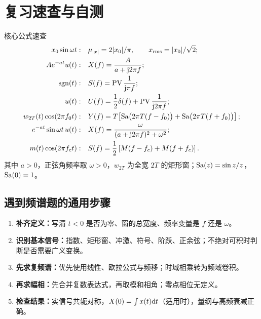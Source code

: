\clearpage
\section{复习速查与自测}
\label{sec:review}

\begin{focusbox}{核心公式速查}
\begin{align*}
x_0\sin\omega t:\quad &\mu_{|x|}=2|x_0|/\pi,\qquad x_{\mathrm{rms}}=|x_0|/\sqrt{2};\\
Ae^{-at}u(t):\quad &X(f)=\frac{A}{a+\mathrm{j}2\pi f};\\
\operatorname{sgn}(t):\quad &S(f)=\operatorname{PV}\frac{1}{\mathrm{j}\pi f};\\
u(t):\quad &U(f)=\frac12\delta(f)+\operatorname{PV}\frac{1}{\mathrm{j}2\pi f};\\
w_{2T}(t)\cos(2\pi f_0t):\quad
&Y(f)=T\!\left[\operatorname{Sa}\bigl(2\pi T(f-f_0)\bigr)+\operatorname{Sa}\bigl(2\pi T(f+f_0)\bigr)\right];\\
e^{-at}\sin\omega t\,u(t):\quad &X(f)=\frac{\omega}{(a+\mathrm{j}2\pi f)^2+\omega^2};\\
m(t)\cos(2\pi f_ct):\quad &S(f)=\frac12\left[M(f-f_c)+M(f+f_c)\right].
\end{align*}
其中 $a>0$，正弦角频率取 $\omega>0$，$w_{2T}$ 为全宽 $2T$ 的矩形窗；$\operatorname{Sa}(z)=\sin z/z$，$\operatorname{Sa}(0)=1$。
\end{focusbox}

\subsection*{遇到频谱题的通用步骤}
\begin{enumerate}
\item \textbf{补齐定义：}写清 $t<0$ 是否为零、窗的总宽度、频率变量是 $f$ 还是 $\omega$。
\item \textbf{识别基本信号：}指数、矩形窗、冲激、符号、阶跃、正余弦；不绝对可积时判断是否需要广义变换。
\item \textbf{先求复频谱：}优先使用线性、欧拉公式与频移；时域相乘转为频域卷积。
\item \textbf{再求幅相：}先合并复数表达式，再取模和相角；零点相位无定义。
\item \textbf{检查结果：}实信号共轭对称，$X(0)=\int x(t)\mathrm{d} t$（适用时），量纲与高频衰减正确。
\end{enumerate}

